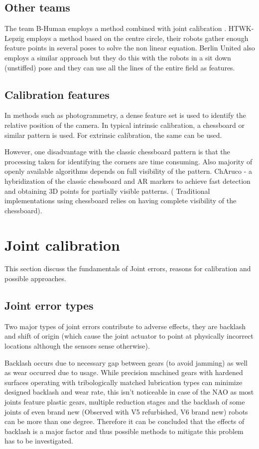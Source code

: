 \documentclass[english, printversion, nomenclature, notitle]{tuvisionthesis} %
\begin{document}
\subsection{Other teams}
The team B-Human employs a method combined with joint calibration . HTWK-Lepzig employs a method based on the centre circle, their robots gather enough feature points in several poses to solve the non linear equation. Berlin United also employs a similar approach but they do this with the robots in a sit down (unstiffed) pose and they can use all the lines of the entire field as features.

\subsection{Calibration features}

In methods such as photogrammetry, a dense feature set is used to identify the relative position of the camera. In typical intrinsic calibration, a chessboard or similar pattern is used. For extrinsic calibration, the same can be used.

However, one disadvantage with the classic chessboard pattern is that the processing taken for identifying the corners are time consuming. Also majority of openly available algorithms depends on full visibility of the pattern.
ChAruco - a hybridization of the classic chessboard and AR markers to achieve fast detection and obtaining 3D points for partially visible patterns. ( Traditional implementations using chessboard relies on having complete visibility of the chessboard).

\section{Joint calibration}
This section discuss the fundamentals of Joint errors, reasons for calibration and possible approaches.

\subsection{Joint error types}
Two major types of joint errors contribute to adverse effects, they are backlash and shift of origin (which cause the joint actuator to point at physically incorrect locations although the sensors sense otherwise). 

Backlash occurs due to necessary gap between gears (to avoid jamming) as well as wear occurred due to usage. While precision machined gears with hardened surfaces operating with tribologically matched lubrication types can minimize designed backlash and wear rate, this isn't noticeable in case of the NAO as most joints feature plastic gears, multiple reduction stages and the backlash of some joints of even brand new (Observed with V5 refurbished, V6 brand new) robots can be more than one degree. Therefore it can be concluded that the effects of backlash is a major factor and thus possible methods to mitigate this problem has to be investigated.
\end{document}
